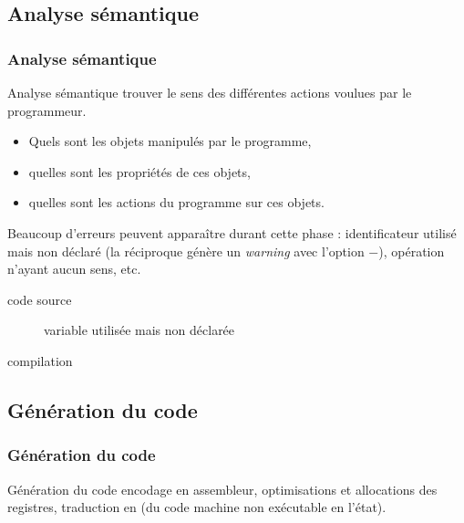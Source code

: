 \documentclass[xcolor=pdftex,svgnames,table]{beamer}
\begin{document}
\subsection{Analyse sémantique}
\begin{frame}
\frametitle{Analyse sémantique}
\begin{block}{Analyse sémantique\youwrite}
  trouver le sens des différentes actions
  voulues par le programmeur.
  \begin{itemize}
  \item Quels sont les objets manipulés par le programme,
  \item quelles sont les propriétés de ces objets,
  \item quelles sont les actions du programme sur ces objets.
  \end{itemize}

\end{block}
\pause
Beaucoup d'erreurs peuvent apparaître durant cette phase : identificateur utilisé mais non
déclaré (la réciproque génère un \emph{warning} avec l'option $-$), opération n'ayant
aucun sens, etc.


\begin{description}
\item[code source] variable  utilisée mais non déclarée
\item[compilation] 
\end{description}
\end{frame}


\subsection{Génération du code}
\begin{frame}
\frametitle{Génération du code}
\begin{block}{Génération du code\youwrite}
  encodage en assembleur, optimisations et allocations des registres,
  traduction en  (du code machine non exécutable
  en l'état). 
\end{block}
\end{frame}
\end{document}
